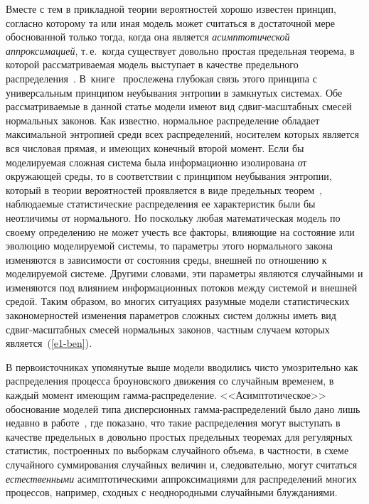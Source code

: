 \begin{multicols}{2}
Вместе с тем в прикладной теории вероятностей хорошо известен
принцип, согласно которому та или иная модель может считаться в
достаточной мере обоснованной только тогда, когда она является {\it
асимптотической аппроксимацией}, т.\,е.\ ког\-да существует довольно
простая предельная теорема, в которой рассматриваемая модель
выступает в качестве предельного распределения~\cite{GnedenkoKolmogorov1949}. 
В~книге~\cite{GnedenkoKorolev1996}
прослежена глубокая связь этого принципа с универсальным принципом
неубывания энтропии в замкнутых сис\-те\-мах. Обе рассматриваемые в
данной статье модели имеют вид сдвиг-мас\-штаб\-ных смесей нормальных
законов. Как известно, нормальное распределение обладает
максимальной энтропией среди всех распределений, носителем которых
является вся числовая прямая, и имеющих конечный второй момент. Если
бы моделируемая сложная сис\-те\-ма была информационно изолирована от
окружающей среды, то в соответствии с принципом неубывания энтропии,
который в теории вероятностей проявляется в виде предельных 
тео\-рем~\cite{GnedenkoKorolev1996}, наблюдаемые статистические распределения
ее характеристик были бы неотличимы от нормального. Но поскольку
любая математическая модель по своему определению не может учесть
все факторы, влияющие на состояние или эволюцию моделируемой
сис\-те\-мы, то параметры этого нормального закона изменяются в
зависимости от состояния среды, внешней по отношению к моделируемой
системе. Другими словами, эти параметры являются случайными и
изменяются под влиянием информационных потоков между сис\-те\-мой и
внешней средой. Таким образом, во многих ситуациях разумные модели
статистических закономерностей изменения параметров сложных сис\-тем
должны иметь вид сдвиг-масштабных смесей нормальных законов, частным
случаем которых является~(\ref{e1-ben}).

В первоисточниках упомянутые выше модели вводились чисто
умозрительно как распределения процесса броуновского движения со
случайным временем, в каждый момент имеющим гам\-ма-рас\-пре\-де\-ле\-ние.
<<Асимптотическое>> обоснование моделей типа дисперсионных
гам\-ма-рас\-пре\-де\-ле\-ний было дано лишь недавно в работе~\cite{KorolevSokolov2012}, 
где показано, что такие распределения
могут выступать в качестве предельных в довольно простых предельных
теоремах для регулярных статистик, построенных по выборкам
случайного объема, в част\-ности, в схеме случайного суммирования
случайных величин и, следовательно, могут считаться {\it
естественными} асимптотическими аппроксимациями для распределений
многих процессов, например, сходных с неоднородными случайными
блужданиями.


\end{multicols}
